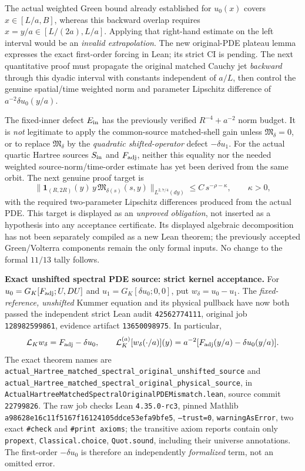 \documentclass[11pt]{amsart}
\begin{document}
The actual weighted Green bound already established for
\(u_0(x)\) covers \(x\in[L/a,B]\), whereas this backward overlap
requires \(x=y/a\in[L/(2a),L/a]\).  Applying that right-hand
estimate on the left interval would be an \emph{invalid
extrapolation}.  The new original-PDE plateau lemma
\texttt{}
expresses the exact first-order forcing in Lean; its strict
CI is pending.  The next quantitative proof must propagate
the original matched Cauchy jet \emph{backward} through this
dyadic interval with constants independent of \(a/L\), then
control the genuine spatial/time weighted norm and parameter
Lipschitz difference of \(a^{-2}\delta u_0(y/a)\).

The fixed-inner defect \(E_{\rm in}\) has the previously
verified \(R^{-4}+a^{-2}\) norm budget.  It is \emph{not}
legitimate to apply the common-source matched-shell gain unless
\(\mathfrak M_\delta=0\), or to replace \(\mathfrak M_\delta\) by
the \emph{quadratic shifted-operator} defect
\(-\delta u_1\).  For the actual quartic Hartree sources
\(S_{\rm in}\) and \(F_{\rm adj}\), neither this equality nor the
needed weighted source-norm/time-order estimate has yet been
derived from the same orbit.  The next genuine proof target is
\[
 \bigl\|
  \mathbf 1_{(R,2R)}(y)\,
  y\,\mathfrak M_{\delta(s)}(s,y)
 \bigr\|_{L^{2,7/4}(dy)}
 \le C\,s^{-\rho-\kappa},\qquad\kappa>0,
\]
with the required two-parameter Lipschitz differences produced
from the actual PDE. This target is displayed as an
\emph{unproved obligation}, not inserted as a hypothesis into
any acceptance certificate.  Its displayed algebraic
decomposition has not been separately compiled as a new Lean
theorem; the previously accepted Green/Volterra components
remain the only formal inputs.  No change to the formal
\(11/13\) tally follows.



\medskip
\noindent\textbf{Exact unshifted spectral PDE source: strict kernel acceptance.}
For \(u_0=G_K[F_{\rm adj};U,DU]\) and
\(u_1=G_K[\delta u_0;0,0]\), put \(w_\delta=u_0-u_1\).
The \emph{fixed-reference, unshifted} Kummer equation and its physical
pullback have now both passed the independent strict Lean audit
\texttt{42562774111}, original job \texttt{128982599861},
evidence artifact \texttt{13650098975}. In particular,
\[
  \mathcal L_K w_\delta=F_{\rm adj}-\delta u_0,\qquad
  \mathcal L_K^{(a)}[w_\delta(\cdot/a)](y)
   =a^{-2}[F_{\rm adj}(y/a)-\delta u_0(y/a)] .
\]
The exact theorem names are
\texttt{actual\_Hartree\_matched\_spectral\_original\_unshifted\_source}
and
\texttt{actual\_Hartree\_matched\_spectral\_original\_physical\_source},
in \texttt{ActualHartreeMatchedSpectralOriginalPDEMismatch.lean},
source commit \texttt{22799826}. The raw job checks Lean
\texttt{4.35.0-rc3}, pinned Mathlib
\texttt{a98628e16c11f5167f16124105ddce53efa9bfe5},
\texttt{--trust=0}, \texttt{warningAsError},
two exact \texttt{\#check} and \texttt{\#print axioms};
the transitive axiom reports contain only
\texttt{propext}, \texttt{Classical.choice}, \texttt{Quot.sound},
including their universe annotations. The first-order
\(-\delta u_0\) is therefore an independently
\emph{formalized} term, not an omitted error.
\end{document}
